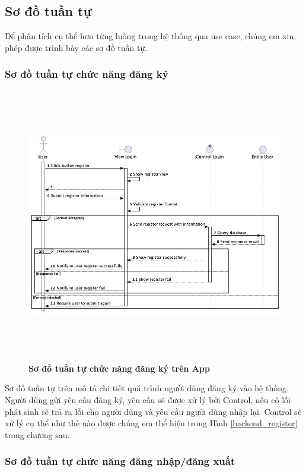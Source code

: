 \newpage
\subsection{Sơ đồ tuần tự}
Để phân tích cụ thể hơn từng luồng trong hệ thống qua use case, chúng em xin phép được trình bày các sơ đồ tuần
tự. 
\subsubsection{Sơ đồ tuần tự chức năng đăng ký}
  \begin{figure}[H]
        \centering
        \includegraphics[width=16cm,height=12cm]{Images/mobile_app/register.png}
        \caption[Sơ đồ tuần tự chức năng đăng ký trên App]{\bfseries \fontsize{12pt}{0pt}
        \selectfont Sơ đồ tuần tự chức năng đăng ký trên App}
        \label{register} %
  \end{figure}
  Sơ đồ tuần tự trên mô tả chi tiết quá trình người dùng đăng ký vào hệ thống. Người dùng gửi yêu cầu đăng ký, yêu cầu sẽ
  được xử lý bởi Control, nếu có lỗi phát sinh sẽ trả ra lỗi cho người dùng và yêu cầu người dùng nhập lại. Control
  sẽ xử lý cụ thể như thế nào được chúng em thể hiện trong Hình \ref{backend_register} trong chương sau.
\subsubsection{Sơ đồ tuần tự chức năng đăng nhập/đăng xuất}

